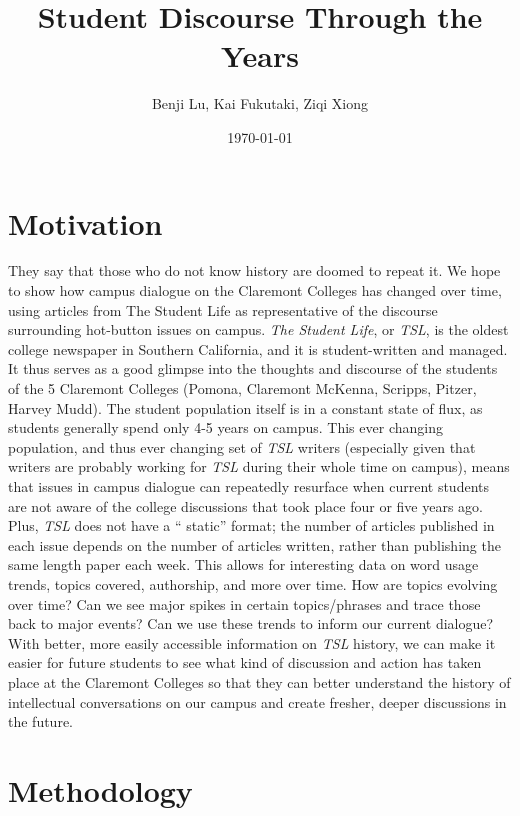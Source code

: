 \documentclass[a4paper]{article}
\title{Student Discourse Through the Years}
\author{Benji Lu, Kai Fukutaki, Ziqi Xiong}
\date{\today}
\begin{document}
\maketitle





\section{Motivation}
They say that those who do not know history are doomed to repeat it. We hope to show how campus dialogue on the Claremont Colleges has changed over time, using articles from The Student Life as representative of the discourse surrounding hot-button issues on campus. \textit{The Student Life}, or \textit{TSL}, is the oldest college newspaper in Southern California, and it is student-written and managed. It thus serves as a good glimpse into the thoughts and discourse of the students of the 5 Claremont Colleges (Pomona, Claremont McKenna, Scripps, Pitzer, Harvey Mudd). The student population itself is in a constant state of flux, as students generally spend only 4-5 years on campus. This ever changing population, and thus ever changing set of \textit{TSL} writers (especially given that writers are probably working for \textit{TSL} during their whole time on campus), means that issues in campus dialogue can repeatedly resurface when current students are not aware of the college discussions that took place four or five years ago. Plus, \textit{TSL} does not have a `` static''  format; the number of articles published in each issue depends on the number of articles written, rather than publishing the same length paper each week. This allows for interesting data on word usage trends, topics covered, authorship, and more over time. How are topics evolving over time? Can we see major spikes in certain topics/phrases and trace those back to major events? Can we use these trends to inform our current dialogue? With better, more easily accessible information on \textit{TSL} history, we can make it easier for future students to see what kind of discussion and action has taken place at the Claremont Colleges so that they can better understand the history of intellectual conversations on our campus and create fresher, deeper discussions in the future.

\section{Methodology}
\end{document}
